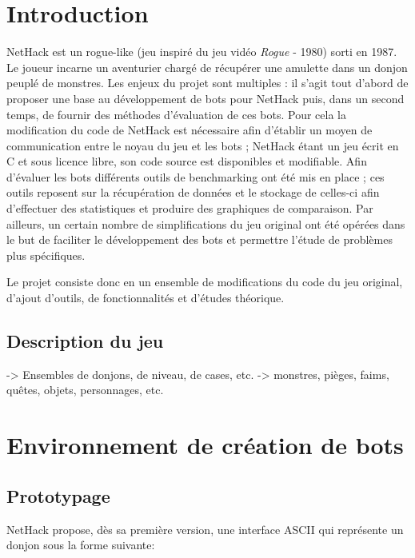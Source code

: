 \documentclass[a4paper,12pt]{article}
\begin{document}
\tableofcontents
\pagebreak

\section{Introduction}

NetHack est un rogue-like (jeu inspiré du jeu vidéo \emph{Rogue} - 1980)
sorti en 1987. Le joueur incarne un aventurier chargé de récupérer une
amulette dans un donjon peuplé de monstres.
Les enjeux du projet sont multiples : il s'agit tout d'abord de proposer une
base au développement de bots pour NetHack puis, dans un second temps, de
fournir des méthodes d'évaluation de ces bots. Pour cela la modification du code
de NetHack est nécessaire afin d'établir un moyen de communication entre le
noyau du jeu et les bots ; NetHack étant un jeu écrit en C et sous licence
libre, son code source est disponibles et modifiable. Afin d'évaluer les bots
différents outils de benchmarking ont été mis en place ; ces outils reposent
sur la récupération de données et le stockage de celles-ci afin d'effectuer
des statistiques et produire des graphiques de comparaison.
Par ailleurs, un certain nombre de simplifications du jeu original ont été
opérées dans le but de faciliter le développement des bots et permettre
l'étude de problèmes plus spécifiques.  

Le projet consiste donc en un ensemble de modifications du code du jeu
original, d'ajout d'outils, de fonctionnalités et d'études théorique.

\subsection*{Description du jeu}
-> Ensembles de donjons, de niveau, de cases, etc.
-> monstres, pièges, faims, quêtes, objets, personnages, etc.

\section{Environnement de création de bots}

\subsection{Prototypage}

NetHack propose, dès sa première version, une interface ASCII qui représente un donjon sous la forme suivante:
\end{document}
